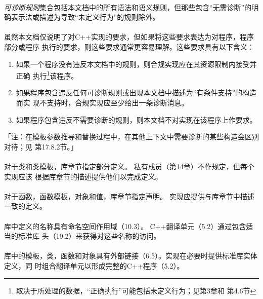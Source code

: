 
\paragraph{}
\textit{可诊断规则}集合包括本文档中的所有语法和语义规则，但那些包含“无需诊断”的明
确表示法或描述为导致“未定义行为”的规则除外。

\paragraph{}
虽然本文档仅说明了对C++实现的要求，但如果将这些要求表达为对程序，程序部分或程序
执行的要求，则这些要求通常更容易理解。这些要求具有以下含义：
\begin{enumerate}
  \item 如果一个程序没有违反本文档中的规则，则合规实现应在其资源限制内接受并正确
    执行\footnote{取决于所处理的数据，“正确执行”可能包括未定义行为；见第3章和
    第4.6节}该程序。
  \item 如果程序包含违反任何可诊断规则或出现本文档中描述为“有条件支持”的构造而实
    现不支持时，合规实现应至少给出一条诊断消息。
  \item 如果程序包含违反不需要诊断的规则，则本文档不对实现在该程序上作要求。
\end{enumerate}
「注：在模板参数推导和替换过程中，在其他上下文中需要诊断的某些构造会区别对待；见
第17.8.2节。」

\paragraph{}
对于类和类模板，库章节指定部分定义。 私有成员（第14章）不作规定，但每个实现应该
根据库章节的描述提供他们以完成定义。

\paragraph{}
对于函数，函数模板，对象和值，库章节指定声明。 实现应提供与库章节中描述一致的定义。

\paragraph{}
库中定义的名称具有命名空间作用域（10.3）。 C++翻译单元（5.2）通过包含适当的标准库
头（19.2）来获得对这些名称的访问。

\paragraph{}
库中的模板，类，函数和对象具有外部链接（6.5）。实现在必要时提供标准库实体定义，同
时组合翻译单元以形成完整的C++程序（5.2）。

